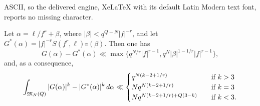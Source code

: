 \documentclass[10pt,a4paper]{amsart}
\def\grM{{\mathfrak M}}\def\grN{{\mathfrak N}}
\renewcommand{\d}{\,{\rm d}} %
\begin{document}
ASCII, so the delivered engine, XeLaTeX with its default Latin Modern text font, reports no missing character.
\begin{lemma}\label{major-arcs}
    Let $\alpha = \ell/f^r + \beta$, where $|\beta| < q^{Q-N}|f|^{-r}$, and let $G^*(\alpha) = |f|^{-r}S(f^r,\ell)v(\beta)$. Then one has
    \[G(\alpha) - G^*(\alpha) \ll \max\{q^{N/r}|f|^{r-1},q^N|\beta|^{1-1/r}|f|^{r-1}\},\]
    and, as a consequence,
    \[\int_{\grM_N(Q)} |G(\alpha)|^k -  |G^*(\alpha)|^k \d\alpha \ll \begin{cases}
        q^{N(k-2+1/r)} \quad &\text{if } k>3 \\
        Nq^{N(k-2+1/r)} \quad &\text{if } k=3 \\
        Nq^{N(k-2+1/r) + Q(3-k)} \quad &\text{if } k < 3.
    \end{cases}\]
\end{lemma}
\end{document}
